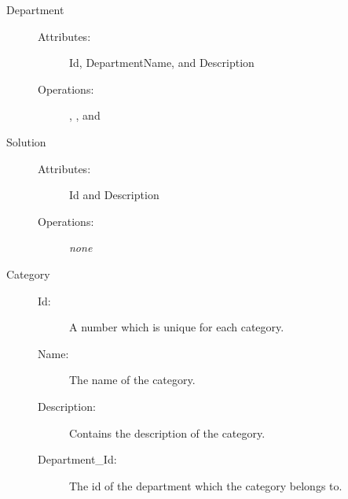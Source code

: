 \begin{description}
\item[Department]\hfill
\begin{description}
	\item[Attributes:]Id, DepartmentName, and Description
	\item[Operations:], , and 
\end{description}
\end{description}

\begin{description}
\item[Solution]\hfill
\begin{description}
	\item[Attributes:]Id and Description
	\item[Operations:] \textit{none}
\end{description}
\end{description}

\begin{description}
\item[Category]\hfill
\begin{description}
\item[Id:] A number which is unique for each category. 
\item[Name:] The name of the category.
\item[Description:] Contains the description of the category.
\item[Department\_Id:] The id of the department which the category belongs to. 
\end{description}
\end{description}

